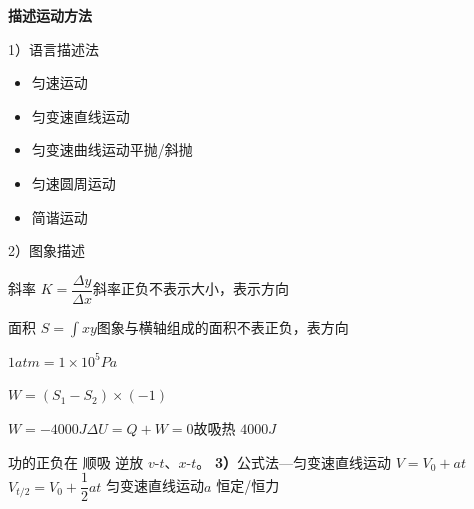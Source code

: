 \textbf{描述运动方法}

1）语言描述法
\begin{itemize}
\item 匀速运动
\item 匀变速直线运动
\item 匀变速曲线运动\quad 平抛/斜抛
\item 匀速圆周运动
\item 简谐运动
\end{itemize}
2）图象描述

斜率 $K=\dfrac{\Delta y}{\Delta x}$\quad 斜率正负不表示大小，表示方向

面积 $S=\int xy$\quad 图象与横轴组成的面积\quad 不表正负，表方向 %
\begin{problem}
\begin{solution}
$1\unit{atm}=1\times10^5\unit{Pa}$

$W=$$(S_1-S_2)\times(-1)$ %

$W=-4000\unit{J}$\quad $\Delta U=Q+W=0$\quad 故吸热 $4000\unit{J}$
\end{solution}
\end{problem}
功的正负\quad 在 顺吸 逆放
$v$-$t$、$x$-$t$。
\textbf{3）}公式法\quad —匀变速直线运动 $V=V_0+at$
$V_{t/2}=V_0+\dfrac12at$
匀变速直线运动\quad $a$ 恒定/恒力

